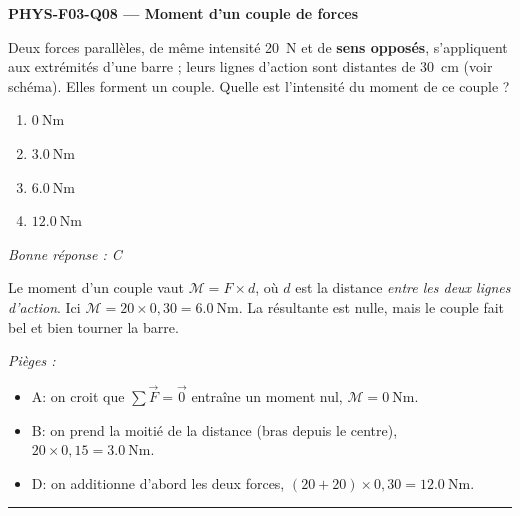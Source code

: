 \documentclass[11pt,a4paper]{article}
\newcommand{\vv}[1]{\vec{#1}}\newcommand{\ds}{\displaystyle}
\begin{document}
\noindent\textbf{PHYS-F03-Q08 --- Moment d'un couple de forces}\par
Deux forces parallèles, de même intensité \qty{20}{\newton} et de \textbf{sens opposés}, s'appliquent
aux extrémités d'une barre ; leurs lignes d'action sont distantes de \qty{30}{\centi\metre} (voir
schéma). Elles forment un couple. Quelle est l'intensité du moment de ce couple ?
\begin{center}
\end{center}
\begin{enumerate}[label=\Alph*)]
\item $\qty{0}{\newton\metre}$
\item $\qty{3.0}{\newton\metre}$
\item $\qty{6.0}{\newton\metre}$
\item $\qty{12.0}{\newton\metre}$
\end{enumerate}
\textit{Bonne réponse : C}\par
Le moment d'un couple vaut $\mathcal{M} = F\times d$, où $d$ est la distance \emph{entre les deux lignes
d'action}. Ici $\mathcal{M} = 20\times 0{,}30 = \qty{6.0}{\newton\metre}$. La résultante est nulle, mais le
couple fait bel et bien tourner la barre.\par
\textit{Pièges :}
\begin{itemize}
\item A: on croit que $\sum\vv F = \vv 0$ entraîne un moment nul, $\mathcal{M} = \qty{0}{\newton\metre}$.
\item B: on prend la moitié de la distance (bras depuis le centre), $20\times 0{,}15 = \qty{3.0}{\newton\metre}$.
\item D: on additionne d'abord les deux forces, $(20+20)\times 0{,}30 = \qty{12.0}{\newton\metre}$.
\end{itemize}
\vspace{8pt}\hrule\vspace{8pt}
\end{document}
